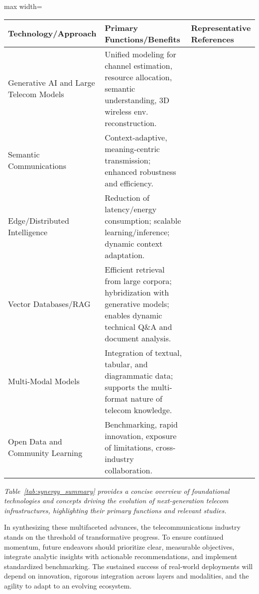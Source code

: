 \documentclass[sigconf]{acmart}
\begin{document}
\begin{table*}[htbp]
\centering
\caption{Summary of Key Synergistic Technologies and Their Roles in Next-Gen Telecom}
\label{tab:synergy_summary}
\begin{adjustbox}{max width=\textwidth}
\begin{tabular}{lll}
\toprule
\textbf{Technology/Approach} & \textbf{Primary Functions/Benefits} & \textbf{Representative References} \\
\midrule
Generative AI and Large Telecom Models  & Unified modeling for channel estimation, resource allocation, semantic understanding, 3D wireless env. reconstruction. & \cite{ref24,ref20,ref26} \\
Semantic Communications   & Context-adaptive, meaning-centric transmission; enhanced robustness and efficiency. & \cite{ref20,ref26} \\
Edge/Distributed Intelligence & Reduction of latency/energy consumption; scalable learning/inference; dynamic context adaptation. & \cite{ref12,ref14,ref19,ref21,ref25} \\
Vector Databases/RAG  & Efficient retrieval from large corpora; hybridization with generative models; enables dynamic technical Q\&A and document analysis. & \cite{ref11,ref22,ref23,ref29} \\
Multi-Modal Models  & Integration of textual, tabular, and diagrammatic data; supports the multi-format nature of telecom knowledge. & \cite{ref21,ref29} \\
Open Data and Community Learning & Benchmarking, rapid innovation, exposure of limitations, cross-industry collaboration. & \cite{ref11,ref21,ref22,ref23} \\
\bottomrule
\end{tabular}
\end{adjustbox}
\end{table*}

\textit{Table~\ref{tab:synergy_summary} provides a concise overview of foundational technologies and concepts driving the evolution of next-generation telecom infrastructures, highlighting their primary functions and relevant studies.}

\vspace{2em}
\noindent
In synthesizing these multifaceted advances, the telecommunications industry stands on the threshold of transformative progress. To ensure continued momentum, future endeavors should prioritize clear, measurable objectives, integrate analytic insights with actionable recommendations, and implement standardized benchmarking. The sustained success of real-world deployments will depend on innovation, rigorous integration across layers and modalities, and the agility to adapt to an evolving ecosystem.
\end{document}
